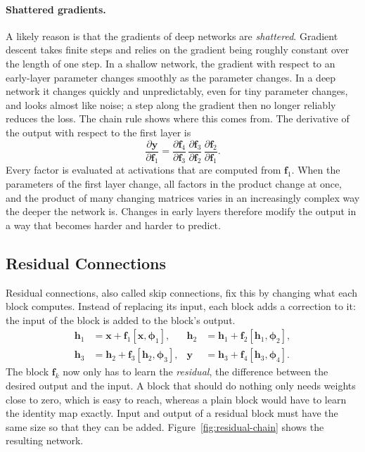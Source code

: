 \paragraph{Shattered gradients.}
A likely reason is that the gradients of deep networks are \emph{shattered}.
Gradient descent takes finite steps and relies on the gradient being roughly
constant over the length of one step. In a shallow network, the gradient with
respect to an early-layer parameter changes smoothly as the parameter changes.
In a deep network it changes quickly and unpredictably, even for tiny parameter
changes, and looks almost like noise; a step along the gradient then no longer
reliably reduces the loss. The chain rule shows where this comes from. The
derivative of the output with respect to the first layer is
\begin{equation}
  \frac{\partial \mathbf{y}}{\partial \mathbf{f}_1}
  = \frac{\partial \mathbf{f}_4}{\partial \mathbf{f}_3}\,
    \frac{\partial \mathbf{f}_3}{\partial \mathbf{f}_2}\,
    \frac{\partial \mathbf{f}_2}{\partial \mathbf{f}_1} .
  \label{eq:plain-chain}
\end{equation}
\noindent
Every factor is evaluated at activations that are computed from $\mathbf{f}_1$.
When the parameters of the first layer change, all factors in the product change
at once, and the product of many changing matrices varies in an increasingly
complex way the deeper the network is. Changes in early layers therefore modify
the output in a way that becomes harder and harder to predict.

\subsection{Residual Connections}

Residual connections, also called skip connections, fix this by changing what
each block computes. Instead of replacing its input, each block adds a
correction to it: the input of the block is added to the block's output.
\begin{equation}
  \begin{aligned}
    \mathbf{h}_1 &= \mathbf{x} + \mathbf{f}_1[\mathbf{x}, \boldsymbol{\phi}_1], &
    \mathbf{h}_2 &= \mathbf{h}_1 + \mathbf{f}_2[\mathbf{h}_1, \boldsymbol{\phi}_2], \\
    \mathbf{h}_3 &= \mathbf{h}_2 + \mathbf{f}_3[\mathbf{h}_2, \boldsymbol{\phi}_3], &
    \mathbf{y} &= \mathbf{h}_3 + \mathbf{f}_4[\mathbf{h}_3, \boldsymbol{\phi}_4].
  \end{aligned}
  \label{eq:residual}
\end{equation}
\noindent
The block $\mathbf{f}_k$ now only has to learn the \emph{residual}, the
difference between the desired output and the input. A block that should do
nothing only needs weights close to zero, which is easy to reach, whereas a
plain block would have to learn the identity map exactly. Input and output of a
residual block must have the same size so that they can be added.
Figure~\ref{fig:residual-chain} shows the resulting network.

